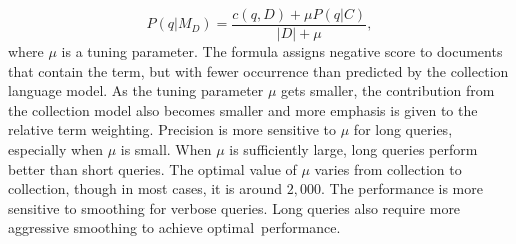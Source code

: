 \begin{equation}
\label{eq:bayessmoothing}
 P(q|M_{D}) = \frac{c(q,D) + \mu P(q|C)}{|D| + \mu},
\end{equation} 
where $ \mu $ is a tuning parameter.
The formula assigns negative score to documents that contain the term, but with fewer occurrence than predicted by the collection language model. As the tuning parameter $ \mu $ gets smaller, the contribution from the collection model also becomes smaller and more emphasis is given to the relative term weighting. Precision is more sensitive to $ \mu $ for long queries, especially when $ \mu $ is small. When $ \mu $ is sufficiently large, long queries perform better than short queries. The optimal value of $ \mu $ varies from collection to collection, though in most cases, it is around $2, 000$. The performance is more sensitive to smoothing for verbose queries. Long queries also require more aggressive smoothing to achieve optimal~performance. 